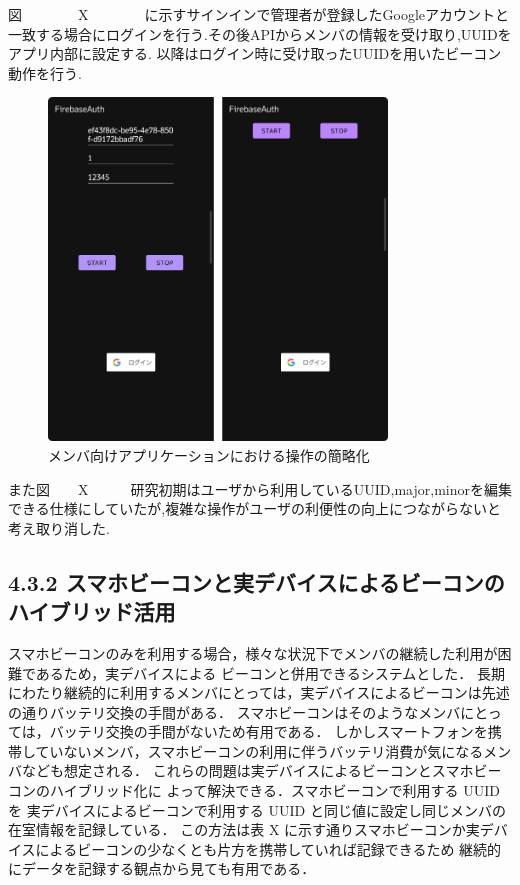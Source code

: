 図　　　　X　　　　に示すサインインで管理者が登録したGoogleアカウントと一致する場合にログインを行う.その後APIからメンバの情報を受け取り,UUIDをアプリ内部に設定する.
以降はログイン時に受け取ったUUIDを用いたビーコン動作を行う.


\begin{figure}[tbh]
  \centering
  \includegraphics[width=9cm]{image/AppBeforeAfter.png}
  \caption{メンバ向けアプリケーションにおける操作の簡略化}
  \label{multipleBPM}
\end{figure}

また図　　X　　　研究初期はユーザから利用しているUUID,major,minorを編集できる仕様にしていたが,複雑な操作がユーザの利便性の向上につながらないと考え取り消した.





\subsection*{4.3.2 スマホビーコンと実デバイスによるビーコンのハイブリッド活用}
スマホビーコンのみを利用する場合，様々な状況下でメンバの継続した利用が困難であるため，実デバイスによる
ビーコンと併用できるシステムとした．
長期にわたり継続的に利用するメンバにとっては，実デバイスによるビーコンは先述の通りバッテリ交換の手間がある．
スマホビーコンはそのようなメンバにとっては，バッテリ交換の手間がないため有用である．
しかしスマートフォンを携帯していないメンバ，スマホビーコンの利用に伴うバッテリ消費が気になるメンバなども想定される．
これらの問題は実デバイスによるビーコンとスマホビーコンのハイブリッド化に
よって解決できる．スマホビーコンで利用する UUID を
実デバイスによるビーコンで利用する UUID と同じ値に設定し同じメンバの在室情報を記録している．
この方法は表      X        に示す通りスマホビーコンか実デバイスによるビーコンの少なくとも片方を携帯していれば記録できるため
継続的にデータを記録する観点から見ても有用である．


